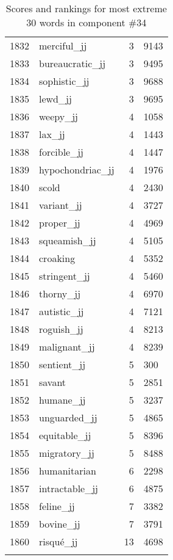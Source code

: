 \begin{longtable}[!htbp]{| rlr@{.}l |}
    1832 & merciful\_jj & 3 & 9143 \\
    1833 & bureaucratic\_jj & 3 & 9495 \\
    1834 & sophistic\_jj & 3 & 9688 \\
    1835 & lewd\_jj & 3 & 9695 \\
    1836 & weepy\_jj & 4 & 1058 \\
    1837 & lax\_jj & 4 & 1443 \\
    1838 & forcible\_jj & 4 & 1447 \\
    1839 & hypochondriac\_jj & 4 & 1976 \\
    1840 & scold & 4 & 2430 \\
    1841 & variant\_jj & 4 & 3727 \\
    1842 & proper\_jj & 4 & 4969 \\
    1843 & squeamish\_jj & 4 & 5105 \\
    1844 & croaking & 4 & 5352 \\
    1845 & stringent\_jj & 4 & 5460 \\
    1846 & thorny\_jj & 4 & 6970 \\
    1847 & autistic\_jj & 4 & 7121 \\
    1848 & roguish\_jj & 4 & 8213 \\
    1849 & malignant\_jj & 4 & 8239 \\
    1850 & sentient\_jj & 5 & 300 \\
    1851 & savant & 5 & 2851 \\
    1852 & humane\_jj & 5 & 3237 \\
    1853 & unguarded\_jj & 5 & 4865 \\
    1854 & equitable\_jj & 5 & 8396 \\
    1855 & migratory\_jj & 5 & 8488 \\
    1856 & humanitarian & 6 & 2298 \\
    1857 & intractable\_jj & 6 & 4875 \\
    1858 & feline\_jj & 7 & 3382 \\
    1859 & bovine\_jj & 7 & 3791 \\
    1860 & risqué\_jj & 13 & 4698 \\
    \hline
    \caption{Scores and rankings for most extreme 30 words in component \#34} \\
\end{longtable}
